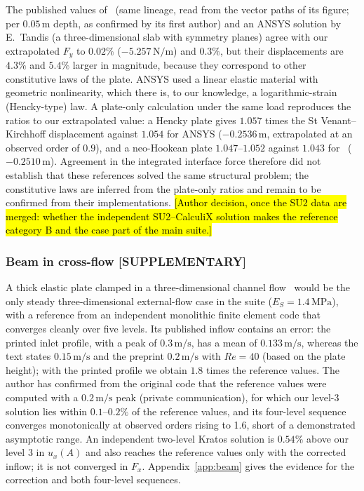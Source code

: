 The published values of~\citet{Tukovic2018} (same lineage, read from the vector paths of its figure; per $0.05\,\mathrm{m}$ depth, as confirmed by its first author) and an ANSYS solution by E.~Tandis (a three-dimensional slab with symmetry planes) agree with our extrapolated $F_y$ to $0.02\%$ ($-5.257\,\mathrm{N/m}$) and $0.3\%$, but their displacements are $4.3\%$ and $5.4\%$ larger in magnitude, because they correspond to other constitutive laws of the plate.
ANSYS used a linear elastic material with geometric nonlinearity, which there is, to our knowledge, a logarithmic-strain (Hencky-type) law.
A plate-only calculation under the same load reproduces the ratios to our extrapolated value: a Hencky plate gives $1.057$ times the St Venant--Kirchhoff displacement against $1.054$ for ANSYS ($-0.2536\,\mathrm{m}$, extrapolated at an observed order of $0.9$), and a neo-Hookean plate $1.047$--$1.052$ against $1.043$ for~\citet{Tukovic2018} ($-0.2510\,\mathrm{m}$).
Agreement in the integrated interface force therefore did not establish that these references solved the same structural problem; the constitutive laws are inferred from the plate-only ratios and remain to be confirmed from their implementations.
\hl{[Author decision, once the SU2 data are merged: whether the independent SU2--CalculiX solution makes the reference category B and the case part of the main suite.]}

\subsubsection{Beam in cross-flow [SUPPLEMENTARY]}\label{sec:beam}

A thick elastic plate clamped in a three-dimensional channel flow~\citep{Richter2012} would be the only steady three-dimensional external-flow case in the suite ($E_S = 1.4\,\mathrm{MPa}$), with a reference from an independent monolithic finite element code that converges cleanly over five levels.
Its published inflow contains an error: the printed inlet profile, with a peak of $0.3\,\mathrm{m/s}$, has a mean of $0.133\,\mathrm{m/s}$, whereas the text states $0.15\,\mathrm{m/s}$ and the preprint $0.2\,\mathrm{m/s}$ with $Re = 40$ (based on the plate height); with the printed profile we obtain $1.8$ times the reference values. The author has confirmed from the original code that the reference values were computed with a $0.2\,\mathrm{m/s}$ peak (private communication), for which our level-3 solution lies within $0.1$--$0.2\%$ of the reference values, and its four-level sequence converges monotonically at observed orders rising to 1.6, short of a demonstrated asymptotic range.
An independent two-level Kratos solution is $0.54\%$ above our level 3 in $u_x(A)$ and also reaches the reference values only with the corrected inflow; it is not converged in $F_x$.
Appendix~\ref{app:beam} gives the evidence for the correction and both four-level sequences.

